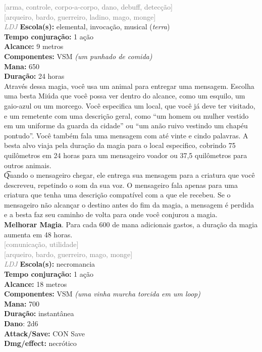 \documentclass{RPG_Adventure}[2021/10/20]
\begin{document}
{\scriptsize \textcolor{gray}{[arma, controle, corpo-a-corpo, dano, debuff, detecção]\\}}
{\scriptsize \textcolor{gray}{[arqueiro, bardo, guerreiro, ladino, mago, monge]\\}}
{\tiny \textcolor{gray}{\textit{LDJ}}}
{\small \t \textbf{Escola(s):} elemental, invocação, musical (\textit{terra})\\\t \textbf{Tempo conjuração:} 1 ação\\\t \textbf{Alcance:} 9 metros\\\t \textbf{Componentes:} VSM \textit{(um punhado de comida)}\\\t \textbf{Mana:} 650\\\t \textbf{Duração:} 24 horas\\}
{\normalsize Através dessa magia, você usa um animal para entregar uma mensagem. Escolha uma besta Miúda que você possa ver dentro do alcance, como um esquilo, um gaio-azul ou um morcego. Você especifica um local, que você já deve ter visitado, e um remetente com uma descrição geral, como “um homem ou mulher vestido em um uniforme da guarda da cidade” ou “um anão ruivo vestindo um chapéu pontudo”. Você também fala uma mensagem com até vinte e cindo palavras. A besta alvo viaja pela duração da magia para o local especifico, cobrindo 75 quilômetros em 24 horas para um mensageiro voador ou 37,5 quilômetros para outros animais.\\\t Quando o mensageiro chegar, ele entrega sua mensagem para a criatura que você descreveu, repetindo o som da sua voz. O mensageiro fala apenas para uma criatura que tenha uma descrição compatível com a que ele recebeu. Se o mensageiro não alcançar o destino antes do fim da magia, a mensagem é perdida e a besta faz seu caminho de volta para onde você conjurou a magia.\\\t \textbf{Melhorar Magia}. Para cada 600 de mana adicionais gastos, a duração da magia aumenta em 48 horas.\\}
{\scriptsize \textcolor{gray}{[comunicação, utilidade]\\}}
{\scriptsize \textcolor{gray}{[arqueiro, bardo, guerreiro, mago, monge]\\}}
{\tiny \textcolor{gray}{\textit{LDJ}}}
{\small \t \textbf{Escola(s):} necromancia\\\t \textbf{Tempo conjuração:} 1 ação\\\t \textbf{Alcance:} 18 metros\\\t \textbf{Componentes:} VSM \textit{(uma vinha murcha torcida em um loop)}\\\t \textbf{Mana:} 700\\\t \textbf{Duração:} instantânea\\\t \textbf{Dano}: 2d6\\\t \textbf{Attack/Save:} CON Save\\\t \textbf{Dmg/effect:} necrótico\\}
\end{document}
